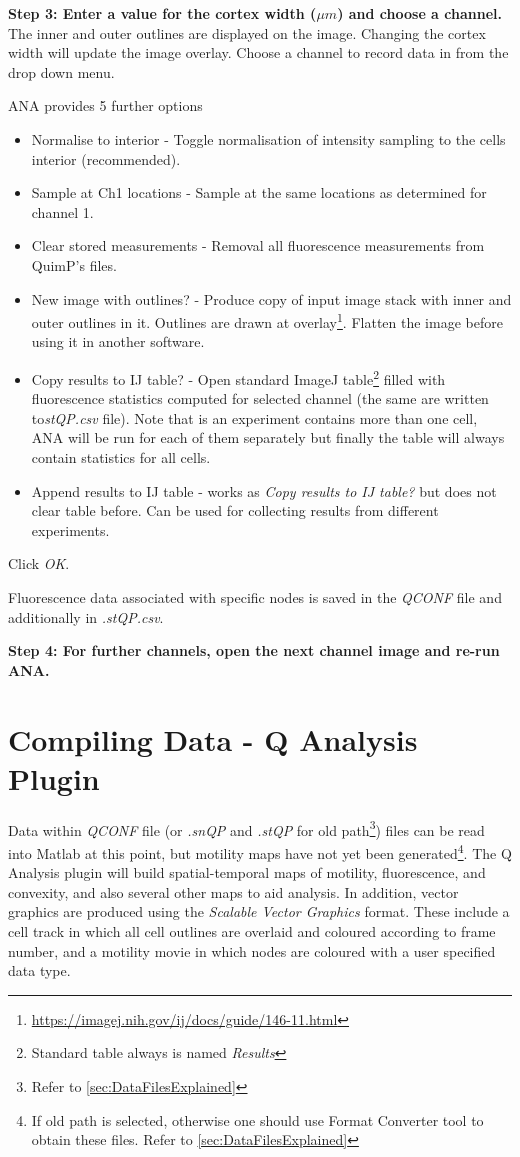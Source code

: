 \documentclass[a4paper,12pt]{article}
\begin{document}
\textbf{Step 3: Enter a value for the cortex width ($\mu m$) and choose a channel.}  The inner and outer outlines
are displayed on the image.  Changing the cortex width will update the image overlay.
Choose a channel to record data in from the drop down menu.

ANA provides 5 further options
\begin{itemize}
	\item Normalise to interior - Toggle normalisation of intensity sampling to the cells interior (recommended).
	\item Sample at Ch1 locations - Sample at the same locations as determined for channel 1.
	\item Clear stored measurements - Removal all fluorescence measurements from QuimP's files.
	\item New image with outlines? - Produce copy of input image stack with inner and outer outlines in it. Outlines are drawn at overlay\footnote{\url{https://imagej.nih.gov/ij/docs/guide/146-11.html}}. Flatten the image before using it in another software.  
	\item Copy results to IJ table? - Open standard ImageJ table\footnote{Standard table always is named \textit{Results}} filled with fluorescence statistics computed for selected channel (the same are written to\textit{stQP.csv} file). Note that is an experiment contains more than one cell, ANA will be run for each of them separately but finally the table will always contain statistics for all cells. 
	\item Append results to IJ table - works as \textit{Copy results to IJ table?} but does not clear table before. Can be used for collecting results from different experiments. 
\end{itemize}

Click \textit{OK}.
  
Fluorescence data associated with specific nodes is saved in the \textit{QCONF} file and additionally in \textit{.stQP.csv}.

\textbf{Step 4: For further channels, open the next channel image and re-run ANA.}

\section{Compiling Data - Q Analysis Plugin}

Data within \textit{QCONF} file (or \textit{.snQP} and \textit{.stQP} for old path\footnote{Refer to \autoref{sec:DataFilesExplained}}) files can be read into Matlab at this point, but motility maps have not yet been generated\footnote{If old path is selected, otherwise one should use Format Converter tool to obtain these files. Refer to \autoref{sec:DataFilesExplained}}.
The Q Analysis plugin will build spatial-temporal maps of motility, fluorescence, and convexity,
and also several other maps to aid analysis.  In addition, vector graphics are produced 
using the \textit{Scalable Vector Graphics} format.  These include a cell track in which all cell outlines are overlaid and coloured
according to frame number, and a motility movie in which nodes are coloured with a user specified data type.
\end{document}
